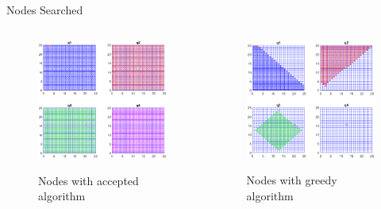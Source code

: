 \documentclass{beamer}
\begin{document}
\begin{frame}{Nodes Searched}
\begin{columns}
  
  \begin{column}{0.5\textwidth}
\begin{figure}[!htb]
\centering
\includegraphics[scale=0.3]{macceptedPlot}
\label{fig:animAccept}
\caption{Nodes with accepted algorithm}
\end{figure}
\end{column}


  \begin{column}{0.5\textwidth}
\begin{figure}[!htb]
\centering
\includegraphics[scale=0.32]{mourPlot}
\label{fig:animOur}
\caption{Nodes with greedy algorithm}
\end{figure}
\end{column}


\end{columns}

\end{frame}
\end{document}
